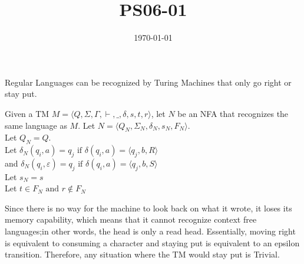 \documentclass{article}
\title{PS06-01}
\date{\today}
\begin{document}
\maketitle
Regular Languages can be recognized by Turing Machines that only go right or stay put. 

Given a TM $M = \langle Q, \Sigma, \Gamma, \vdash, \_, \delta, s, t, r\rangle$, let $N$ be an NFA that recognizes the same language as $M$. Let $N = \langle Q_N, \Sigma_N, \delta_N, s_N, F_N \rangle$.\\
Let $Q_N = Q$.\\
Let $\delta_N(q_i,a) = q_j \text{ if } \delta(q_i, a) = \langle q_j, b, R \rangle$\\
and $\delta_N(q_i,\varepsilon) = q_j \text{ if } \delta(q_i, a) = \langle q_j, b, S \rangle$\\
Let $s_N = s$\\
Let $t \in F_N \text{ and } r \notin F_N$

Since there is no way for the machine to look back on what it wrote, it loses its memory capability, which means that it cannot recognize context free languages;in other words, the head is only a read head. Essentially, moving right is equivalent to consuming a character and staying put is equivalent to an epsilon transition. Therefore, any situation where the TM would stay put is Trivial.
\end{document}
